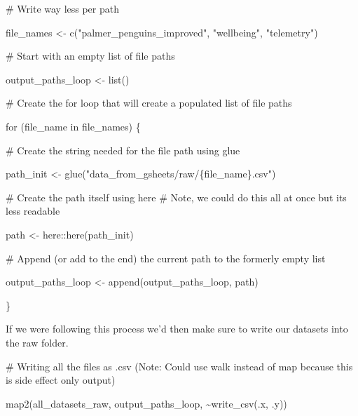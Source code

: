 \documentclass[
  letterpaper,
  DIV=11,
  numbers=noendperiod]{scrreprt}
\newenvironment{Shaded}{\begin{snugshade}}{\end{snugshade}}
\newcommand{\CommentTok}[1]{\textcolor[rgb]{0.37,0.37,0.37}{#1}}
\newcommand{\ControlFlowTok}[1]{\textcolor[rgb]{0.00,0.23,0.31}{#1}}
\newcommand{\FunctionTok}[1]{\textcolor[rgb]{0.28,0.35,0.67}{#1}}
\newcommand{\NormalTok}[1]{\textcolor[rgb]{0.00,0.23,0.31}{#1}}
\newcommand{\OtherTok}[1]{\textcolor[rgb]{0.00,0.23,0.31}{#1}}
\newcommand{\SpecialCharTok}[1]{\textcolor[rgb]{0.37,0.37,0.37}{#1}}
\newcommand{\StringTok}[1]{\textcolor[rgb]{0.13,0.47,0.30}{#1}}
\begin{document}
\begin{Shaded}
\begin{Highlighting}[]
\CommentTok{\# Write way less per path}

\NormalTok{file\_names }\OtherTok{\textless{}{-}} \FunctionTok{c}\NormalTok{(}\StringTok{"palmer\_penguins\_improved"}\NormalTok{,}
                \StringTok{"wellbeing"}\NormalTok{,}
                \StringTok{"telemetry"}\NormalTok{)}

\CommentTok{\# Start with an empty list of file paths}

\NormalTok{output\_paths\_loop }\OtherTok{\textless{}{-}} \FunctionTok{list}\NormalTok{()}

\CommentTok{\# Create the for loop that will create a populated list of file paths}

\ControlFlowTok{for}\NormalTok{ (file\_name }\ControlFlowTok{in}\NormalTok{ file\_names) \{}
  
  \CommentTok{\# Create the string needed for the file path using \textasciigrave{}glue\textasciigrave{}}
  
\NormalTok{  path\_init }\OtherTok{\textless{}{-}} \FunctionTok{glue}\NormalTok{(}\StringTok{"data\_from\_gsheets/raw/\{file\_name\}.csv"}\NormalTok{)}
  
  \CommentTok{\# Create the path itself using \textasciigrave{}here\textasciigrave{}}
  \CommentTok{\# Note, we could do this all at once but it\textquotesingle{}s less readable}
  
\NormalTok{  path }\OtherTok{\textless{}{-}}\NormalTok{ here}\SpecialCharTok{::}\FunctionTok{here}\NormalTok{(path\_init)}
  
  \CommentTok{\# Append (or add to the end) the current path to the formerly empty list}
  
\NormalTok{  output\_paths\_loop }\OtherTok{\textless{}{-}} \FunctionTok{append}\NormalTok{(output\_paths\_loop, path)}
  
\NormalTok{\}}
\end{Highlighting}
\end{Shaded}

If we were following this process we'd then make sure to write our
datasets into the raw folder.

\begin{Shaded}
\begin{Highlighting}[]
\CommentTok{\# Writing all the files as .csv (Note: Could use \textasciigrave{}walk\textasciigrave{} instead of \textasciigrave{}map\textasciigrave{} because this is side effect only output)}

\FunctionTok{map2}\NormalTok{(all\_datasets\_raw, output\_paths\_loop, }\SpecialCharTok{\textasciitilde{}}\FunctionTok{write\_csv}\NormalTok{(.x, .y))}
\end{Highlighting}
\end{Shaded}
\end{document}

